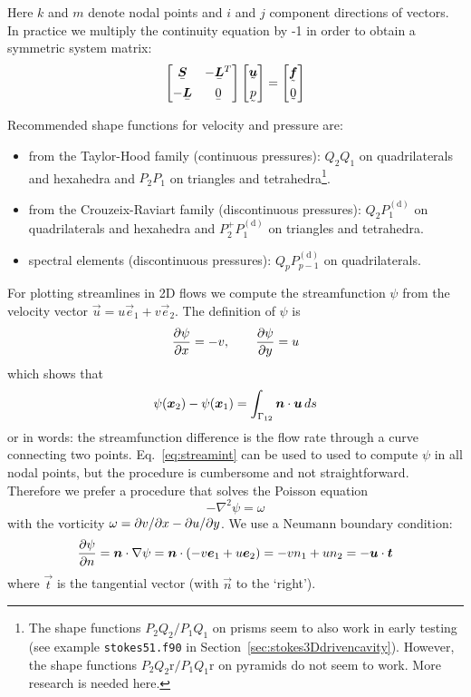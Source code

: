 Here $k$ and $m$ denote nodal points and $i$ and $j$ component directions of
vectors. In practice we multiply the continuity equation by -1 in order to
obtain a symmetric system matrix:
\[
 \begin{bmatrix}
   \mat{\ten S} &-\mat{\vek L}^T \\[1ex]
   -\mat{\vek L} &\mat 0
 \end{bmatrix}
 \begin{bmatrix}
    \col{\vek u}\\[1ex]
    \col p
 \end{bmatrix}=
 \begin{bmatrix}
    \col{\vek f}\\[1ex]
    \col 0
 \end{bmatrix}
\]

Recommended shape functions for velocity and pressure are:
\begin{itemize}
 \item from the Taylor-Hood
family (continuous pressures): $Q_2Q_1$ on quadrilaterals and hexahedra and
$P_2P_1$ on triangles and tetrahedra\footnote{The shape functions $P_2Q_2/P_1Q_1$ on prisms seem to also work in early testing (see example \texttt{stokes51.f90} in Section~\ref{sec:stokes3Ddrivencavity}).
However, the shape functions $P_2Q_2\text{r}/P_1Q_1\text{r}$ on pyramids do not seem to work. More research is needed here.}.
 \item from the Crouzeix-Raviart
family (discontinuous pressures): $Q_2P_1^{(\text{d})}$ on quadrilaterals
and hexahedra and $P_2^+P_1^{(\text{d})}$ on triangles and tetrahedra.
\item spectral elements (discontinuous pressures): $Q_pP_{p-1}^{(\text{d})}$ on
quadrilaterals.
\end{itemize}

For plotting streamlines in 2D flows we compute the streamfunction 
$\psi$ from the
velocity vector $\vec u=u\vec e_1+v\vec e_2$. The definition of $\psi$ is
\[
   \dfrac{\partial \psi}{\partial x} = -v,\qquad
   \dfrac{\partial \psi}{\partial y} = u
\]
which shows that
\begin{equation}
  \psi(\boldsymbol{x}_2) - \psi(\boldsymbol{x}_1) = \int_{\Gamma_{12}}
      \boldsymbol{n}\cdot\boldsymbol{u}\,d s
    \label{eq:streamint}
\end{equation}
or in words: the streamfunction difference is the flow rate through a curve
connecting two points. Eq.~\eqref{eq:streamint} can be used to used to compute 
$\psi$ in all nodal points, but the procedure is cumbersome and not
straightforward. Therefore we prefer a procedure that solves 
the Poisson equation
\begin{equation}
   -\nabla^2\psi = \omega
\label{eq:streamfunction} 
\end{equation}
with the vorticity $\omega=\partial v/\partial x-\partial u/\partial y$. We use a
Neumann boundary condition:
\begin{equation}
 \begin{split}
   \dfrac{\partial \psi}{\partial n}=\boldsymbol{n}\cdot\nabla\psi=\boldsymbol{n}\cdot(-v\boldsymbol{e}_1+u\boldsymbol{e}_2)=
        -vn_1+un_2=-\boldsymbol{u}\cdot\boldsymbol{t}
 \end{split}
\label{eq:streamNeum}
\end{equation}
where $\vec t$ is the tangential vector (with $\vec n$ to the `right').

